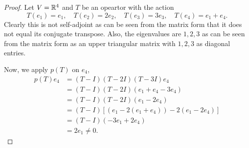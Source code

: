 \documentclass{article}
\begin{document}
\begin{proof}
     Let $V=\mathbb{R}^4$ and $T$ be an opeartor with the action 
    \[
      T(e_1) = e_1, \quad T(e_2) = 2e_2, \quad T(e_3) = 3e_3, \quad T(e_4) = e_1 + e_4.
    \]
    Clearly this is not self-adjoint as can be seen from the matrix form that it does not equal 
    its conjugate transpose. Also, the eigenvalues are $1,2,3$ as can be seen from the matrix form 
    as an upper triangular matrix with $1,2,3$ as diagonal entries. 

    Now, we apply $p(T)$ on $e_4$,
    \begin{align*}
        p(T)e_4 & = (T-I)(T-2I)(T-3I)e_4 \\
        & = (T-I)(T-2I)(e_1+e_4-3e_4) \\
        & = (T-I)(T-2I)(e_1-2e_4) \\
        & = (T-I)[(e_1-2(e_1+e_4)) - 2(e_1-2e_4)] \\
        & = (T-I)(-3e_1+2e_4) \\
        & = 2e_1\neq 0.
    \end{align*}
    
\end{proof}


\newpage
\end{document}
